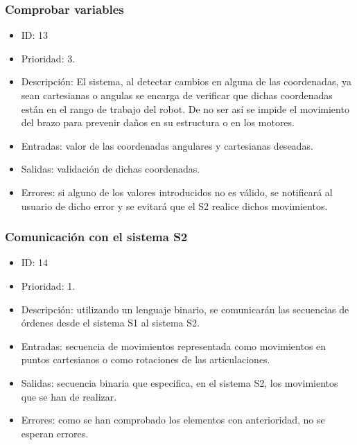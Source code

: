 \subsubsection{Comprobar variables}
\begin{itemize}
    \item ID: 13
    \item Prioridad: 3.
    \item Descripción: El sistema, al detectar cambios en alguna de las coordenadas, ya sean cartesianas o angulas se encarga de verificar que dichas coordenadas están en el rango de trabajo del robot. De no ser así se impide el movimiento del brazo para prevenir daños en su estructura o en los motores.
    \item Entradas: valor de las coordenadas angulares y cartesianas deseadas.
    \item Salidas: validación de dichas coordenadas.
    \item Errores: si alguno de los valores introducidos no es válido, se notificará al usuario de dicho error y se evitará que el \ac{S2} realice dichos movimientos.
\end{itemize}

\subsubsection{Comunicación con el sistema \ac{S2}}
\begin{itemize}
    \item ID: 14
    \item Prioridad: 1.
    \item Descripción: utilizando un lenguaje binario, se comunicarán las secuencias de órdenes desde el sistema \ac{S1} al sistema \ac{S2}.
    \item Entradas: secuencia de movimientos representada como movimientos en puntos cartesianos o como rotaciones de las articulaciones.
    \item Salidas: secuencia binaria que especifica, en el sistema \ac{S2}, los movimientos que se han de realizar.
    \item Errores: como se han comprobado los elementos con anterioridad, no se esperan errores.
\end{itemize}

